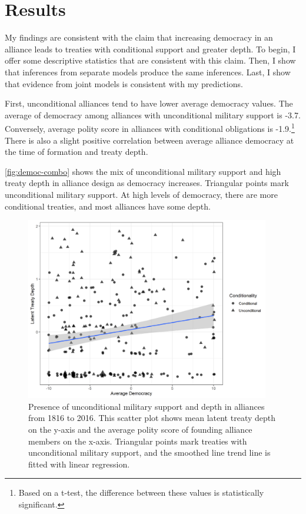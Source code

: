 \documentclass[12pt]{article}
\begin{document}
\section{Results}


My findings are consistent with the claim that increasing democracy in an alliance leads to treaties with conditional support and greater depth. 
To begin, I offer some descriptive statistics that are consistent with this claim.
Then, I show that inferences from separate models produce the same inferences. 
Last, I show that evidence from joint models is consistent with my predictions. 


First, unconditional alliances tend to have lower average democracy values. 
The average of democracy among alliances with unconditional military support is -3.7. 
Conversely, average polity score in alliances with conditional obligations is -1.9.\footnote{Based on a t-test, the difference between these values is statistically significant.} 
There is also a slight positive correlation between average alliance democracy at the time of formation and treaty depth. 

\autoref{fig:democ-combo} shows the mix of unconditional military support and high treaty depth in alliance design as democracy increases. 
Triangular points mark unconditional military support. 
At high levels of democracy, there are more conditional treaties, and most alliances have some depth. 


\begin{figure}[hbtp]
\centering
\includegraphics[width=0.95\textwidth]{../figures/democ-combo.png}
\caption{Presence of unconditional military support and depth in alliances from 1816 to 2016. This scatter plot shows mean latent treaty depth on the y-axis and the average polity score of founding alliance members on the x-axis. Triangular points mark treaties with unconditional military support, and the smoothed line trend line is fitted with linear regression. }
\label{fig:democ-combo}
\end{figure}
\end{document}
